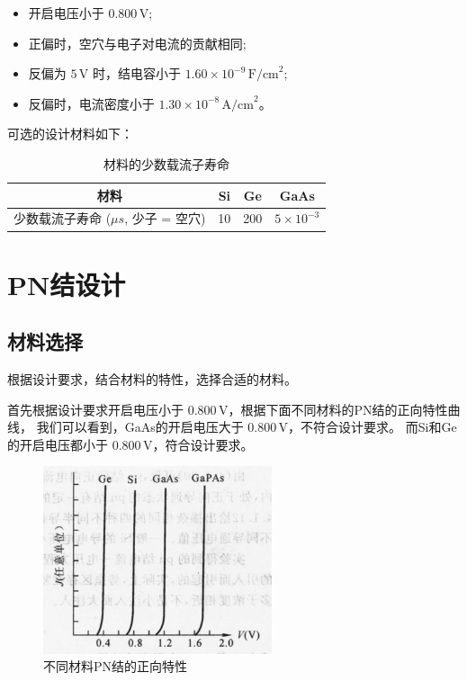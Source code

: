 \documentclass[12pt,hyperref,a4paper,UTF8]{ctexart}
\begin{document}
\begin{itemize}
    \item 开启电压小于 $0.800\, \text{V}$;
    \item 正偏时，空穴与电子对电流的贡献相同;
    \item 反偏为 $5\, \text{V}$ 时，结电容小于 $1.60 \times 10^{-9}\, \text{F/cm}^2$;
    \item 反偏时，电流密度小于 $1.30 \times 10^{-8}\, \text{A/cm}^2$。
\end{itemize}
可选的设计材料如下：
\begin{table}[H]
\centering
\begin{tabular}{|c|c|c|c|}
\hline
材料 & Si & Ge & GaAs \\ \hline
少数载流子寿命 ($\mu s$, 少子 = 空穴) & 10 & 200 & $5 \times 10^{-3}$ \\ \hline
\end{tabular}
\caption{材料的少数载流子寿命}
\end{table}

\newpage


\section{PN结设计}


\subsection{材料选择}
根据设计要求，结合材料的特性，选择合适的材料。

首先根据设计要求开启电压小于 $0.800\, \text{V}$，根据下面不同材料的PN结的正向特性曲线，
我们可以看到，GaAs的开启电压大于 $0.800\, \text{V}$，不符合设计要求。
而Si和Ge的开启电压都小于 $0.800\, \text{V}$，符合设计要求。

\begin{figure}[H]
    \centering
    \includegraphics[width=0.6\textwidth]{figures/fig/image1.png}
    \caption{不同材料PN结的正向特性}
\end{figure}
\end{document}
